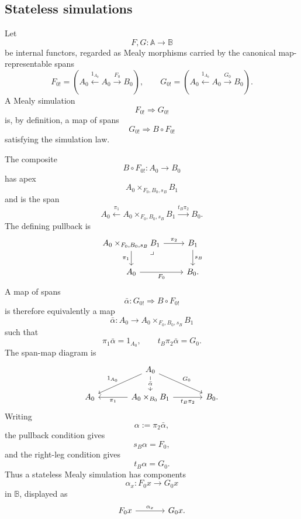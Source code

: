 \subsection{Stateless simulations}
\label{subsec:stateless-mealy-simulations}

Let
\[
    F,G:\mathbb A\to\mathbb B
\]
be internal functors, regarded as Mealy morphisms carried by the canonical map-representable spans
\[
    F_{0!}
    =
    \left(
        A_0
        \xleftarrow{1_{A_0}}
        A_0
        \xrightarrow{F_0}
        B_0
    \right),
    \qquad
    G_{0!}
    =
    \left(
        A_0
        \xleftarrow{1_{A_0}}
        A_0
        \xrightarrow{G_0}
        B_0
    \right).
\]
A Mealy simulation
\[
    F_{0!}\Rightarrow G_{0!}
\]
is, by definition, a map of spans
\[
    G_{0!}\Rightarrow B\circ F_{0!}
\]
satisfying the simulation law.

The composite
\[
    B\circ F_{0!}:A_0\to B_0
\]
has apex
\[
    A_0\times_{F_0,B_0,s_B}B_1
\]
and is the span
\[
    A_0
    \xleftarrow{\pi_1}
    A_0\times_{F_0,B_0,s_B}B_1
    \xrightarrow{t_B\pi_2}
    B_0.
\]
The defining pullback is
\[
    \begin{tikzcd}
            A_0\times_{F_0,B_0,s_B}B_1
                \arrow[r, "\pi_2"]
                \arrow[d, "\pi_1"']
                \arrow[dr, phantom, "\lrcorner", very near start]
        &
            B_1 
                \arrow[d, "s_B"]
        \\
            A_0 
                \arrow[r, "F_0"']
        &
            B_0.
    \end{tikzcd}
\]
A map of spans
\[
    \bar\alpha:G_{0!}\Rightarrow B\circ F_{0!}
\]
is therefore equivalently a map
\[
    \bar\alpha:A_0\to A_0\times_{F_0,B_0,s_B}B_1
\]
such that
\[
    \pi_1\bar\alpha=1_{A_0},
    \qquad
    t_B\pi_2\bar\alpha=G_0.
\]
The span-map diagram is
\[
    \begin{tikzcd}[column sep=large]
        & 
            A_0
                \arrow[d, "\bar\alpha" description]
                \arrow[dl, "1_{A_0}"']
                \arrow[dr, "G_0"]
        &
        \\
            A_0
        &
            A_0\times_{B_0}B_1
                \arrow[l, "\pi_1"]
                \arrow[r, "t_B\pi_2"']
        &
            B_0.
    \end{tikzcd}
\]
Writing
\[
    \alpha:=\pi_2\bar\alpha,
\]
the pullback condition gives
\[
    s_B\alpha=F_0,
\]
and the right-leg condition gives
\[
    t_B\alpha=G_0.
\]
Thus a stateless Mealy simulation has components
\[
    \alpha_x:F_0x\to G_0x
\]
in \(\mathbb B\), displayed as
\[
    \begin{tikzcd}[column sep=large]
            F_0x 
                \arrow[r, "\alpha_x"] 
        & 
            G_0x.
    \end{tikzcd}
\]


